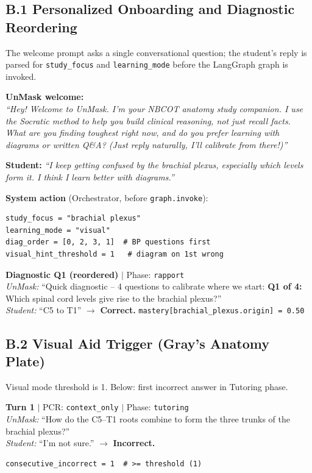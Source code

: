 \documentclass[11pt]{article}
\begin{document}
\subsection*{B.1 Personalized Onboarding and Diagnostic Reordering}

The welcome prompt asks a single conversational question; the student's reply
is parsed for \texttt{study\_focus} and \texttt{learning\_mode} before the
LangGraph graph is invoked.

\noindent\textbf{UnMask welcome:}\\
\textit{``Hey! Welcome to UnMask. I'm your NBCOT anatomy study companion. I
use the Socratic method to help you build clinical reasoning, not just recall
facts. What are you finding toughest right now, and do you prefer learning
with diagrams or written Q\&A? (Just reply naturally, I'll calibrate from
there!)''}

\noindent\textbf{Student:} \textit{``I keep getting confused by the brachial
plexus, especially which levels form it. I think I learn better with
diagrams.''}

\noindent\textbf{System action} (Orchestrator, before \texttt{graph.invoke}):
\begin{lstlisting}
study_focus = "brachial plexus"
learning_mode = "visual"
diag_order = [0, 2, 3, 1]  # BP questions first
visual_hint_threshold = 1   # diagram on 1st wrong
\end{lstlisting}

\noindent\textbf{Diagnostic Q1 (reordered)} $|$ Phase: \texttt{rapport}\\
\textit{UnMask:} ``Quick diagnostic -- 4 questions to calibrate where we start:
\textbf{Q1 of 4:} Which spinal cord levels give rise to the brachial plexus?''\\
\textit{Student:} ``C5 to T1'' $\to$ \textbf{Correct.}
\texttt{mastery[brachial\_plexus.origin] = 0.50}

\subsection*{B.2 Visual Aid Trigger (Gray's Anatomy Plate)}

Visual mode threshold is 1. Below: first incorrect answer in Tutoring phase.

\noindent\textbf{Turn 1} $|$ PCR: \texttt{context\_only} $|$ Phase: \texttt{tutoring}\\
\textit{UnMask:} ``How do the C5--T1 roots combine to form the three trunks
of the brachial plexus?''\\
\textit{Student:} ``I'm not sure.'' $\to$ \textbf{Incorrect.}
\begin{lstlisting}
consecutive_incorrect = 1  # >= threshold (1)
\end{lstlisting}
\end{document}
